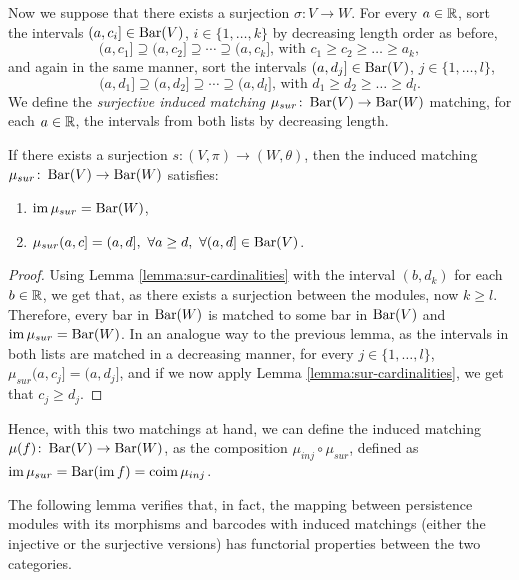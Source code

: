 Now we suppose that there exists a surjection $ \sigma\colon V \to W $. For every $ a \in \mathbb R$, sort the intervals $(a, c_i] \in \operatorname{Bar}(V) $, $i \in \{1, \dots, k\} $ by decreasing length order as before,
$$
    (a, c_1] \supseteq (a, c_2] \supseteq \cdots \supseteq (a, c_k] \text{, with } c_1 \geq c_2 \geq \dots \geq a_k,
$$
and again in the same manner, sort the intervals $(a, d_j] \in \operatorname{Bar}(V) $, $j \in \{1, \dots, l\} $,
$$
    (a, d_1] \supseteq (a, d_2] \supseteq \cdots \supseteq (a, d_l] \text{, with } d_1 \geq d_2 \geq \dots \geq d_l.
$$
We define the {\it surjective induced matching} $\mu_{sur}\colon \operatorname{Bar}(V) \to \operatorname{Bar}(W) $ matching, for each $ a \in \mathbb R $, the intervals from both lists by decreasing length.

\begin{lemma} \cite[Exercise 3.1.8]{polterovich} \label{lemma:sur-matching}
    If there exists a surjection $s\colon (V, \pi) \to (W, \theta) $, then the induced matching $ \mu_{sur}\colon \operatorname{Bar}(V) \to \operatorname{Bar} (W) $ satisfies:
    \begin{enumerate}
        \item $\operatorname{im} \mu_{sur} = \operatorname{Bar}(W)$,
        \item $\mu_{sur}(a, c] = (a, d], \ \forall a \geq d, \ \forall (a, d] \in \operatorname{Bar}(V)$.
    \end{enumerate}
\end{lemma}
\begin{proof}
    Using Lemma \ref{lemma:sur-cardinalities} with the interval $(b, d_k)$ for each $ b \in \mathbb R $, we get that, as there exists a surjection between the modules, now $ k \geq l $. Therefore, every bar in $\operatorname{Bar}(W)$ is matched to some bar in $\operatorname{Bar}(V)$ and $\operatorname{im} \mu_{sur} = \operatorname{Bar}(W)$. In an analogue way to the previous lemma, as the intervals in both lists are matched in a decreasing manner, for every $j \in \{1, \dots, l\} $, $\mu_{sur}(a, c_j] = (a, d_j] $, and if we now apply Lemma \ref{lemma:sur-cardinalities}, we get that $ c_j \geq d_j $.
\end{proof}

Hence, with this two matchings at hand, we can define the {induced matching} $ \mu(f)\colon \operatorname{Bar}(V) \to \operatorname{Bar}(W) $, as the composition $ \mu_{inj} \circ \mu_{sur} $, defined as $ \operatorname{im} \mu_{sur} = \operatorname{Bar}(\operatorname{im} f) = \operatorname{coim} \mu_{inj} $.

The following lemma verifies that, in fact, the mapping between persistence modules with its morphisms and barcodes with induced matchings (either the injective or the surjective versions) has functorial properties between the two categories.

